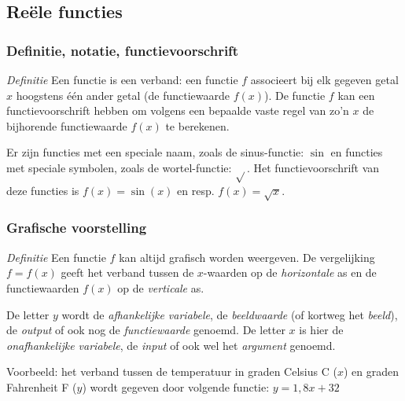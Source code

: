 \subsection{Re\"ele functies}

\subsubsection{Definitie, notatie, functievoorschrift}

\emph{Definitie}
Een functie is een verband: een functie $f$  associeert bij elk gegeven getal $x$ hoogstens \'e\'en ander getal (de functiewaarde $f(x)$). De functie $f$ kan een functievoorschrift hebben om volgens een bepaalde vaste regel van zo'n $x$ de bijhorende functiewaarde $f(x)$ te berekenen.

\noindent Er zijn functies met een speciale naam, zoals de sinus-functie: $\sin$ en functies met speciale symbolen, zoals de wortel-functie: $\sqrt{}$. Het functievoorschrift van deze functies is $f(x)=\sin(x)$ en resp. $f(x)=\sqrt{x}$.

\subsubsection{Grafische voorstelling}

\emph{Definitie}
Een functie $f$  kan altijd grafisch worden weergeven. De vergelijking $f=f(x)$  geeft het verband tussen de $x$-waarden op de \emph{horizontale} as en de functiewaarden $f(x)$ op de \emph{verticale} as.

\noindent De letter $y$ wordt de \emph{afhankelijke variabele}, de
\emph{beeldwaarde} (of kortweg het \emph{beeld}), de \emph{output}
of ook nog de \emph{functiewaarde} genoemd. 
De letter $x$ is hier
de \emph{onafhankelijke variabele}, de \emph{input} of ook wel het
\emph{argument} genoemd. 

\medskip{}


\noindent Voorbeeld: het verband tussen de temperatuur in graden
Celsius \textdegree C ($x$) en graden Fahrenheit \textdegree F ($y$)
wordt gegeven door volgende functie: $y=1,8x+32$

\medskip{}




